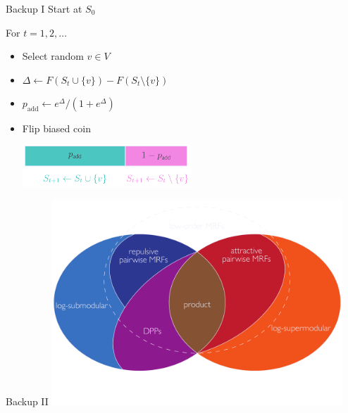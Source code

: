 \documentclass[mathserif]{beamer}
\begin{document}
\begin{frame}{Backup I}
\vspace{1em}
Start at $S_0$

\vspace{1.1em}
For $t = 1, 2, \ldots$
\vspace{1.1em}
\begin{itemize}
\item Select random $v \in V$
\vspace{1.1em}
\item $\Delta \gets F(S_t \cup \{v\}) - F(S_t \setminus \{v\})$
\vspace{1.1em}
\item $p_{\textrm{add}} \gets e^{\Delta} / \left(1 + e^{\Delta}\right)$
\vspace{1.1em}
\item Flip biased coin

\vspace{-1em}
\begin{minipage}{0.5\textwidth}\vspace{2em}\includegraphics[width=2.5in]{figures/gibbs.pdf}\end{minipage}
\end{itemize}
\end{frame}

\begin{frame}{Backup II}
\vspace{0.5em}
\centering
\includegraphics[width=4.3in]{figures/venn07_old_nobold.pdf}
\end{frame}
\end{document}
